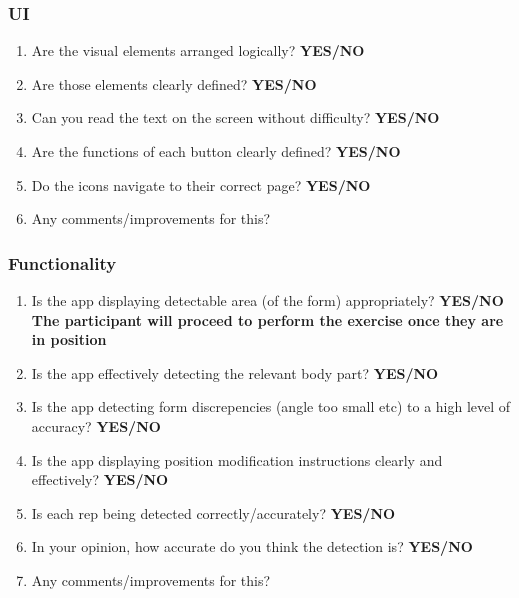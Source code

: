 \documentclass{article}
\begin{document}
\subsubsection{UI}
\begin{enumerate}
    \item Are the visual elements arranged logically? \textbf{YES/NO}
    \item Are those elements clearly defined? \textbf{YES/NO}
    \item Can you read the text on the screen without difficulty? \textbf{YES/NO}
    \item Are the functions of each button clearly defined? \textbf{YES/NO}
    \item Do the icons navigate to their correct page? \textbf{YES/NO}
    \item Any comments/improvements for this?
\end{enumerate} 
\subsubsection{Functionality}
\begin{enumerate}
    \item Is the app displaying detectable area (of the form) appropriately? \textbf{YES/NO} 
    \\\textbf{The participant will proceed to perform the exercise once they are in position}
    \item Is the app effectively detecting the relevant body part? \textbf{YES/NO}
    \item Is the app detecting form discrepencies (angle too small etc) to a high level of accuracy? \textbf{YES/NO}
    \item Is the app displaying position modification instructions clearly and effectively? \textbf{YES/NO}
    \item Is each rep being detected correctly/accurately? \textbf{YES/NO}
    \item In your opinion, how accurate do you think the detection is? \textbf{YES/NO}
    \item Any comments/improvements for this?
\end{enumerate}


\end{document}
